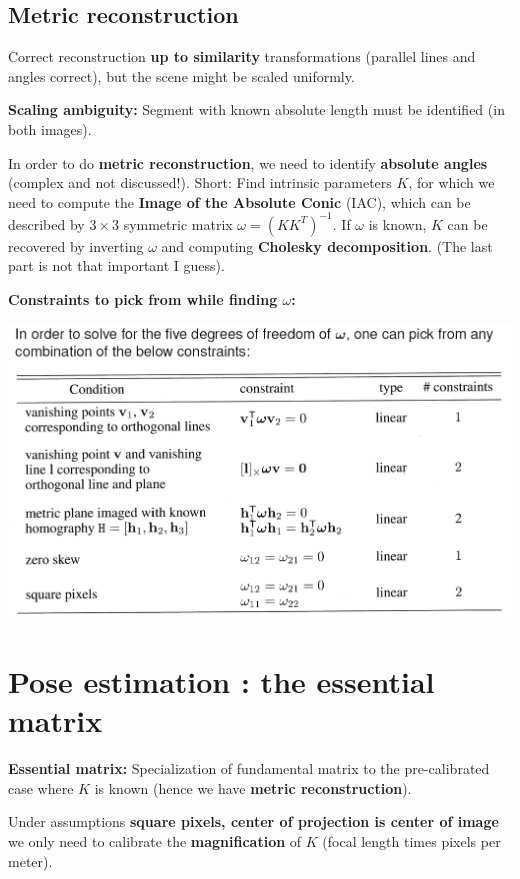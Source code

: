 \subsection{Metric reconstruction}

Correct reconstruction \textbf{up to similarity} transformations (parallel lines and angles correct), but the scene might be scaled uniformly.

\textbf{Scaling ambiguity:} Segment with known absolute length must be identified (in both images).

In order to do \textbf{metric reconstruction}, we need to identify \textbf{absolute angles} (complex and not discussed!). Short: Find intrinsic parameters $K$, for which we need to compute the \textbf{Image of the Absolute Conic} (IAC), which can be described by $3\times 3$ symmetric matrix $\omega = (KK^T)^{-1}$. If $\omega$ is known, $K$ can be recovered by inverting $\omega$ and computing \textbf{Cholesky decomposition}. (The last part is not that important I guess).

\textbf{Constraints to pick from while finding $\omega$:}

\includegraphics[width=\textwidth]{images/chap8/omega_conditions}

\section{Pose estimation : the essential matrix}

\textbf{Essential matrix:} Specialization of fundamental matrix to the pre-calibrated case where $K$ is known (hence we have \textbf{metric reconstruction}).

Under assumptions \textbf{square pixels, center of projection is center of image} we only need to calibrate the \textbf{magnification} of $K$ (focal length times pixels per meter).

